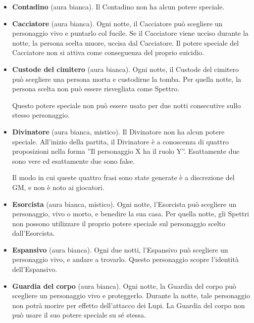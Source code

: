 \documentclass[a4paper,10pt]{article}
\begin{document}
\begin{itemize}
 \item {\bf Contadino} (aura bianca). Il Contadino non ha alcun potere speciale.

 \item {\bf Cacciatore} (aura bianca). Ogni notte, il Cacciatore può scegliere un personaggio vivo e puntarlo col fucile. Se il Cacciatore viene ucciso durante la notte, la persona scelta muore, uccisa dal Cacciatore.
 Il potere speciale del Cacciatore non si attiva come conseguenza del proprio suicidio.
 
 \item {\bf Custode del cimitero} (aura bianca). Ogni notte, il Custode del cimitero può scegliere una persona morta e custodirne la tomba. Per quella notte, la persona scelta non può essere risvegliata come Spettro.
 
 Questo potere speciale non può essere usato per due notti consecutive sullo stesso personaggio.

 \item {\bf Divinatore} (aura bianca, mistico). Il Divinatore non ha alcun potere speciale. All'inizio della partita, il Divinatore è a conoscenza di quattro proposizioni nella forma ''Il personaggio X ha il ruolo Y''. Esattamente due sono vere ed esattamente due sono false.
 
 Il modo in cui queste quattro frasi sono state generate è a discrezione del GM, e non è noto ai giocatori.

 \item {\bf Esorcista} (aura bianca, mistico). Ogni notte, l'Esorcista può scegliere un personaggio, vivo o morto, e benedire la sua casa.
 Per quella notte, gli Spettri non possono utilizzare il proprio potere speciale sul personaggio scelto dall'Esorcista.
 
 \item {\bf Espansivo} (aura bianca). Ogni due notti, l'Espansivo può scegliere un personaggio vivo, e andare a trovarlo. Questo personaggio scopre l'identità dell'Espansivo.

 \item {\bf Guardia del corpo} (aura bianca). Ogni notte, la Guardia del corpo può scegliere un personaggio vivo e proteggerlo. Durante la notte, tale personaggio non potrà morire per effetto dell'attacco dei Lupi.
 La Guardia del corpo non può usare il suo potere speciale su sé stessa.
 

\end{itemize}
\end{document}
